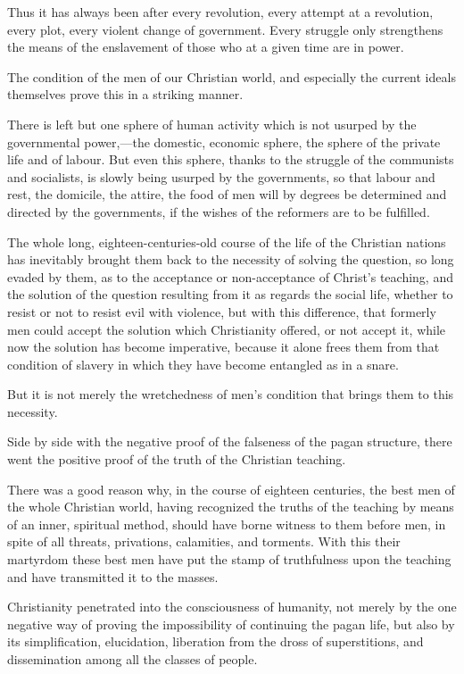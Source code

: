 \documentclass{book}
\begin{document}
Thus it has always been after every revolution, every attempt at a revolution, every plot, every violent change of government. Every struggle only strengthens the means of the enslavement of those who at a given time are in power.

The condition of the men of our Christian world, and especially the current ideals themselves prove this in a striking manner.

There is left but one sphere of human activity which is not usurped by the governmental power,—the domestic, economic sphere, the sphere of the private life and of labour. But even this sphere, thanks to the struggle of the communists and socialists, is slowly being usurped by the governments, so that labour and rest, the domicile, the attire, the food of men will by degrees be determined and directed by the governments, if the wishes of the reformers are to be fulfilled.

The whole long, eighteen-centuries-old course of the life of the Christian nations has inevitably brought them back to the necessity of solving the question, so long evaded by them, as to the acceptance or non-acceptance of Christ’s teaching, and the solution of the question resulting from it as regards the social life, whether to resist or not to resist evil with violence, but with this difference, that formerly men could accept the solution which Christianity offered, or not accept it, while now the solution has become imperative, because it alone frees them from that condition of slavery in which they have become entangled as in a snare.

But it is not merely the wretchedness of men’s condition that brings them to this necessity.

Side by side with the negative proof of the falseness of the pagan structure, there went the positive proof of the truth of the Christian teaching.

There was a good reason why, in the course of eighteen centuries, the best men of the whole Christian world, having recognized the truths of the teaching by means of an inner, spiritual method, should have borne witness to them before men, in spite of all threats, privations, calamities, and torments. With this their martyrdom these best men have put the stamp of truthfulness upon the teaching and have transmitted it to the masses.

Christianity penetrated into the consciousness of humanity, not merely by the one negative way of proving the impossibility of continuing the pagan life, but also by its simplification, elucidation, liberation from the dross of superstitions, and dissemination among all the classes of people.
\end{document}
